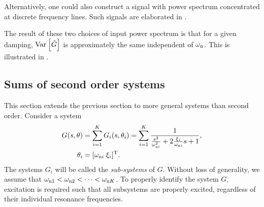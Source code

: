 Alternatively, one could also construct a signal with power spectrum concentrated at discrete frequency lines.
Such signals are elaborated in .




The result of these two choices of input power spectrum is that for a given damping, $\var{\hat{G}}$ is approximately the same independent of $\wn$. 
This is illustrated in .

\subsection{Sums of second order systems}
This section extends the previous section to more general systems than second order.
Consider a system
\begin{align}
G(s,\theta) &= \sum_{i=1}^{K} G_i(s,\theta_i)
             =\sum_{i=1}^{K}  \frac{1}
                                   {   \frac{s^2}{\wn[i]^2}
                                    + 2\frac{\damping[i]}{\wn[i]}s
                                    + 1},\\
\theta_i&=[\wn[i]\;\damping[i]]^{\T}.
\label{eq:excitation:sumSys}
\end{align}
The systems  $G_i$ will be called the \emph{sub-systems} of $G$. 
Without loss of generality, we assume that $\wn[1] < \wn[2] < \cdots < \wn[K]$. 
To properly identify the system $G$, excitation is required such that all subsystems are properly excited, regardless of their individual resonance frequencies.

